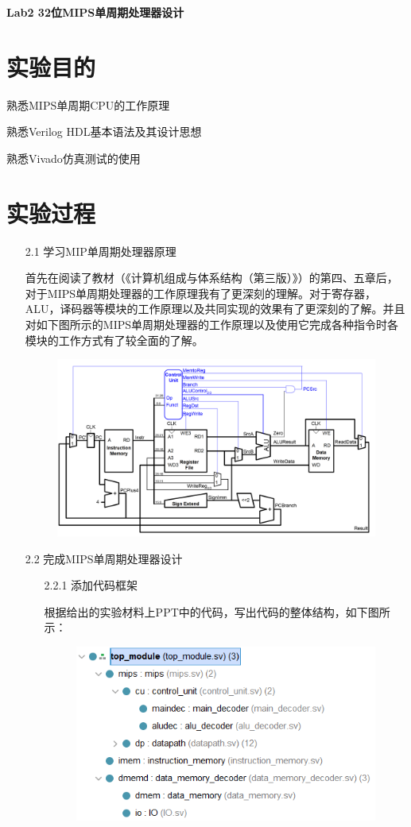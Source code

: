 \documentclass[UTF8]{article}
\begin{document}
	\begin{center}
	\textbf{{\huge Lab2 32位MIPS单周期处理器设计}}
	\end{center}
	\section{实验目的}
	\par 
	熟悉MIPS单周期CPU的工作原理
	
	熟悉Verilog HDL基本语法及其设计思想
	
	熟悉Vivado仿真测试的使用
	\section{实验过程}
	\begin{enumerate}
		\item [2.1] 学习MIP单周期处理器原理
		\par 首先在阅读了教材（《计算机组成与体系结构（第三版）》）的第四、五章后，对于MIPS单周期处理器的工作原理我有了更深刻的理解。对于寄存器，ALU，译码器等模块的工作原理以及共同实现的效果有了更深刻的了解。并且对如下图所示的MIPS单周期处理器的工作原理以及使用它完成各种指令时各模块的工作方式有了较全面的了解。
		\begin{figure}[htbp]
			\centering
			\includegraphics[scale=0.5]{2-1.png}
		\end{figure}
		\item [2.2] 完成MIPS单周期处理器设计
			\begin{enumerate}
				\item [2.2.1] 添加代码框架
					\par 根据给出的实验材料上PPT中的代码，写出代码的整体结构，如下图所示：
					\begin{figure}[htbp]
						\centering
						\includegraphics[scale=1]{2-2-1.png}

\end{figure}
\end{enumerate}
\end{enumerate}
\end{document}
